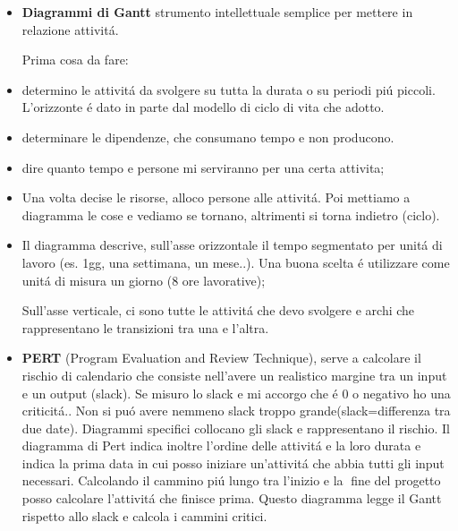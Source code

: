 \documentclass[a4paper,10pt] {article}
\begin{document}
\begin{itemize}
\begin{itemize}
\begin{itemize}
\item \textbf{Diagrammi di Gantt} strumento intellettuale semplice per mettere 
in relazione attivit\'a. 

Prima cosa da fare: 

\item determino le attivit\'a da svolgere su tutta la durata o su periodi 
pi\'u piccoli. L'orizzonte \'e dato in parte dal modello di ciclo di vita che 
adotto.

\item determinare le dipendenze, che consumano tempo e non producono. 

\item dire quanto tempo e persone mi serviranno per una certa attivita;


\item Una volta decise le risorse, alloco persone alle attivit\'a. Poi mettiamo 
a diagramma le cose e vediamo se tornano, altrimenti si torna indietro (ciclo). 

\item Il diagramma descrive, sull'asse orizzontale il tempo segmentato per
unit\'a di lavoro (es. 1gg, una settimana, un mese..). Una buona scelta \'e 
utilizzare come unit\'a di misura un giorno (8 ore lavorative); 

Sull'asse verticale, ci sono tutte le attivit\'a che devo svolgere e archi che 
rappresentano le transizioni tra una e l'altra.



\item \textbf{PERT} (Program Evaluation and Review Technique), serve a 
calcolare il rischio di calendario che consiste nell'avere un realistico 
margine tra un input e un output (slack). Se misuro lo slack e mi accorgo che 
\'e 0 o negativo ho una criticit\'a.. Non si pu\'o avere nemmeno
slack troppo grande(slack=differenza tra due date). Diagrammi specifici 
collocano gli slack e rappresentano il rischio. Il diagramma di Pert indica 
inoltre l'ordine delle attivit\'a e la loro durata e indica la prima data in 
cui posso iniziare un'attivit\'a che abbia tutti gli input necessari. 
Calcolando il cammino pi\'u lungo tra l'inizio e la fine  del progetto 
posso calcolare l'attivit\'a che finisce prima. Questo diagramma legge il Gantt 
rispetto allo slack e calcola i 
cammini critici.




\end{itemize}
\end{itemize}
\end{itemize}
\end{document}
